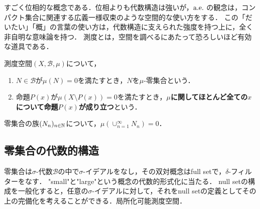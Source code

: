 \documentclass[uplatex, dvipdfmx]{jsreport}
\renewcommand{\B}{\mathcal{B}}
\begin{document}
\begin{tcolorbox}[colframe=ForestGreen, colback=ForestGreen!10!white,breakable,colbacktitle=ForestGreen!40!white,coltitle=black,fonttitle=\bfseries\sffamily,
title=]
    すごく位相的な概念である．位相よりも代数構造は強いが，$\mathrm{a.e.}\;$の観念は，コンパクト集合に関連する広義一様収束のような空間的な使い方をする．
    この「だいたい」「概」の言葉の使い方は，代数構造に支えられた強度を持つ上に，全く非自明な意味論を持つ．
    測度とは，空間を調べるにあたって恐ろしいほど有効な道具である．
\end{tcolorbox}

\begin{definition}
    測度空間$(X,\B,\mu)$について，
    \begin{enumerate}
        \item $N\in\B$が$\mu(N)=0$を満たすとき，$N$を$\mu$-零集合という．
        \item 命題$P(x)$が$\mu(X\setminus P(x))=0$を満たすとき，\textbf{$\mu$に関してほとんど全ての$x$について命題$P(x)$が成り立つ}という．
    \end{enumerate}
\end{definition}

\begin{lemma}[塵は可算個集まっても塵]
    零集合の族$(N_n)_{n\in\mathbb{N}}$について，$\mu(\cup_{n=1}^\infty N_n)=0$．
\end{lemma}

\subsection{零集合の代数的構造}

\begin{tcolorbox}[colframe=ForestGreen, colback=ForestGreen!10!white,breakable,colbacktitle=ForestGreen!40!white,coltitle=black,fonttitle=\bfseries\sffamily,
title=]
    零集合は$\sigma$-代数$\B$の中で$\sigma$-イデアルをなし，その双対概念はfull setで，$\delta$-フィルターをなす．
    "small"と"large"という概念の代数的形式化に当たる．
    null setの構成を一般化すると，任意の$\sigma$-イデアルに対して，それをnull setの定義としてその上の完備化を考えることができる．局所化可能測度空間．
\end{tcolorbox}
\end{document}
